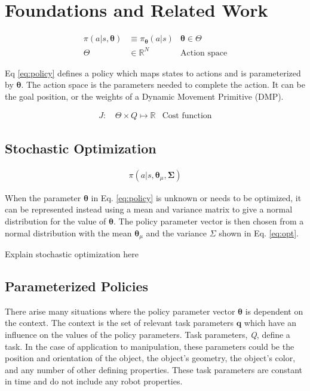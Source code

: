 \documentclass[12pt]{article}
\newcommand{\actsp}{\Theta}
\newcommand{\taskp}{\mathbf{q}}
\newcommand{\costf}{J}
\newcommand{\act}{\bm{\theta}}
\newcommand{\taskpsp}{Q}
\newcommand{\covar}{\bm{\Sigma}}
\begin{document}
\section{Foundations and Related Work}

\begin{align}
\label{eq:policy}\pi(a|s,\act) &\equiv  \pi_{\act}(a|s) & \act \in \actsp \\
\actsp &\in \mathbb{R}^N & \mbox{Action space}
\end{align}

Eq \ref{eq:policy} defines a policy which maps states to actions and is parameterized by $\act$. The action space is the parameters needed to complete the action. It can be the goal position, or the weights of a Dynamic Movement Primitive (DMP).

\begin{align}
\costf\mbox{: } &\label{eq:cost} \actsp \times \taskpsp \mapsto \mathbb{R}&\mbox{Cost function}
\end{align}

\subsection{Stochastic Optimization}

\begin{align}
\label{eq:opt}\pi(a|s,\act_\mu,\covar)
\end{align}

When the parameter $\act$ in Eq. \ref{eq:policy} is unknown or needs to be optimized, it can be represented instead using a mean and variance matrix to give a normal distribution for the value of $\act$. The policy parameter vector is then chosen from a normal distribution with the mean $\act_\mu$ and the variance $\Sigma$ shown in Eq. \ref{eq:opt}.

\color{red}Explain stochastic optimization here \color{black}


\subsection{Parameterized Policies}

There arise many situations where the  policy parameter vector $\act$ is dependent on the context. The context is the set of relevant task parameters $\taskp$ which have an influence on the values of the policy parameters. Task parameters, \emph{\taskpsp}, define a task. In the case of application to manipulation, these parameters could be the position and orientation of the object, the object's geometry, the object's color, and any number of other defining properties. These task parameters are constant in time and do not include any robot properties. 
\end{document}
